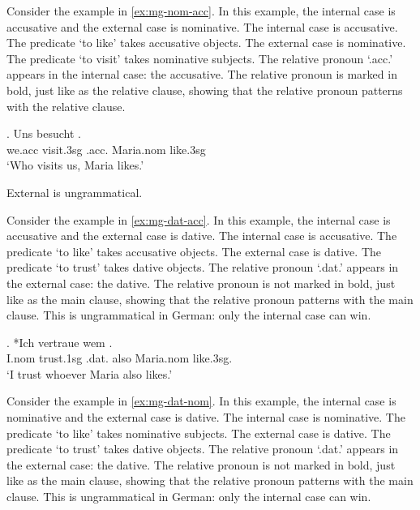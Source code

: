 Consider the example in \ref{ex:mg-nom-acc}. In this example, the internal case is accusative and the external case is nominative.
The internal case is accusative. The predicate  `to like' takes accusative objects.
The external case is nominative. The predicate  `to visit' takes nominative subjects.
The relative pronoun  `.\ac{acc}.' appears in the internal case: the accusative. The relative pronoun is marked in bold, just like as the relative clause, showing that the relative pronoun patterns with the relative clause.

\exg. Uns besucht   .\\
 we.\ac{acc} visit.3\ac{sg}\scsub{[nom]} .\ac{acc}. Maria.\ac{nom} like.3\ac{sg}\scsub{[acc]}\\
 `Who visits us, Maria likes.' \label{ex:mg-nom-acc}

External is ungrammatical.

Consider the example in \ref{ex:mg-dat-acc}. In this example, the internal case is accusative and the external case is dative.
The internal case is accusative. The predicate  `to like' takes accusative objects.
The external case is dative. The predicate  `to trust' takes dative objects.
The relative pronoun  `.\ac{dat}.' appears in the external case: the dative. The relative pronoun is not marked in bold, just like as the main clause, showing that the relative pronoun patterns with the main clause.
This is ungrammatical in German: only the internal case can win.

\exg. *Ich vertraue wem   . \\
I.\ac{nom} trust.1\ac{sg}\scsub{[dat]} .\ac{dat}. also Maria.\ac{nom} like.3\ac{sg}\scsub{[acc]}.\\
`I trust whoever Maria also likes.' \label{ex:mg-dat-acc}

Consider the example in \ref{ex:mg-dat-nom}. In this example, the internal case is nominative and the external case is dative.
The internal case is nominative. The predicate  `to like' takes nominative subjects.
The external case is dative. The predicate  `to trust' takes dative objects.
The relative pronoun  `.\ac{dat}.' appears in the external case: the dative. The relative pronoun is not marked in bold, just like as the main clause, showing that the relative pronoun patterns with the main clause.
This is ungrammatical in German: only the internal case can win.

